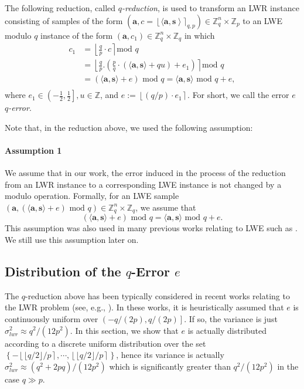 \documentclass{cta-author}
\begin{document}
The following reduction, called \textit{$q$-reduction}, is used to transform an LWR instance consisting of samples of the form
$(\mathbf{a}, c=\left\lfloor \langle \mathbf{a}, \mathbf{s} \right \rangle \rceil_{q,p}) \in \mathbb{Z}_q^{n} \times \mathbb{Z}_p$ to an LWE modulo $q$ instance of the form $(\mathbf{a},c_1) \in \mathbb{Z}_q^{n} \times \mathbb{Z}_q$ in which
\begin{equation} \label{eq4}
\begin{split}
c_1&=\left \lfloor \frac{q}{p} \cdot c \right \rceil \text{mod } q\\
&=\left \lfloor \frac{q}{p}.\left(\frac{p}{q} \cdot (\langle \mathbf{a}, \mathbf{s} \rangle+qu) +e_1 \right)\right\rceil \text{mod } q\\
&=(\langle \mathbf{a}, \mathbf{s} \rangle +e)\text{ mod } q=\langle \mathbf{a}, \mathbf{s} \rangle \text{ mod } q+e,\\
\end{split} 
\end{equation}
where $e_1 \in \left( -\frac{1}{2},\frac{1}{2} \right], u \in \mathbb{Z}$, and $ e:=\left \lfloor (q/p) \cdot e_1 \right \rceil$.
For short, we call the error $e$ \textit{$q$-error}.

Note that, in the reduction above, we used the following assumption:
\paragraph{Assumption 1} We assume that in our work, the error induced in the process of the reduction from an LWR instance to a corresponding LWE instance is not changed by a modulo operation. 
Formally, for an LWE sample $(\mathbf{a},(\langle \mathbf{a}, \mathbf{s} \rangle +e)\text{ mod } q) \in \mathbb{Z}_q^{n} \times \mathbb{Z}_q$, we assume that $$(\langle \mathbf{a}, \mathbf{s} \rangle +e)\text{ mod } q=\langle \mathbf{a}, \mathbf{s} \rangle \text{ mod } q+e.$$
This assumption was also used in many previous works relating to LWE such as \cite{BGV12, BV11a,BV11b,KYGY16}. We still use this assumption later on.
\subsection{Distribution of the $q$-Error $e$}\label{sec3}

The $q$-reduction above has been typically considered in recent works relating to the LWR problem (see, e.g., \cite{BBGM+19, CKLS16, FLX+16}).  In these works, it is heuristically assumed that $e$ is continuously uniform over $\left( -{q}/(2p),{q}/(2p) \right]$. If so, the variance is just $\sigma_{lwr}^2 \approx {q^2}/{(12p^2)}$. In this section, we show that $ e $ is actually distributed according to a discrete uniform distribution over the set $\left\{ -\left\lfloor{\lfloor q/2 \rfloor}/{p} \right \rceil, \cdots, \left\lfloor {\lfloor q/2 \rfloor}/{p} \right \rceil \right\}$, hence its variance is actually $\sigma_{lwr}^2\approx (q^2+2pq)/(12p^2)$ which is significantly greater than $q^2/(12p^2)$ in the case $q \gg p$.
\end{document}
